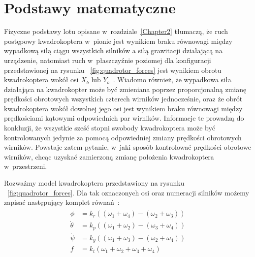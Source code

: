\documentclass[11pt, twoside]{Thesis} %
\begin{document}


\section{Podstawy matematyczne}

Fizyczne podstawy lotu opisane w~rozdziale~\ref{Chapter2} tłumaczą, że ruch postępowy kwadrokoptera w~pionie jest wynikiem braku równowagi między wypadkową siłą ciągu wszystkich silników a siłą grawitacji działającą na urządzenie, natomiast ruch w~płaszczyźnie poziomej dla konfiguracji przedstawionej na rysunku ~\ref{fig:quadrotor_forces} jest wynikiem obrotu kwadrokoptera wokół osi $X_b$ lub $Y_b$~\cite{quadro8, quadro9}. Wiadomo również, że wypadkowa siła działająca na kwadrokopter może być zmieniana poprzez proporcjonalną zmianę prędkości obrotowych wszystkich czterech wirników jednocześnie, oraz że obrót kwadrokoptera wokół dowolnej jego osi jest wynikiem braku równowagi między prędkościami kątowymi odpowiednich par wirników. Informacje te prowadzą do konkluzji, że wszystkie sześć stopni swobody kwadrokoptera może być kontrolowanych jedynie za pomocą odpowiedniej zmiany prędkości obrotowych wirników. Powstaje zatem pytanie, w~jaki sposób kontrolować prędkości obrotowe wirników, chcąc uzyskać zamierzoną zmianę położenia kwadrokoptera w~przestrzeni. 

Rozważmy model kwadrokoptera przedstawiony na rysunku ~\ref{fig:quadrotor_forces}. Dla tak oznaczonych osi oraz numeracji silników możemy zapisać następujący komplet równań~\cite{quadro9}:
\begin{equation}
\begin{aligned}
	\dot{\phi} &= k_r((\omega_1 + \omega_4) - (\omega_2 + \omega_3)) \\
	\dot{\theta} &= k_p((\omega_1 + \omega_2) - (\omega_3 + \omega_4)) \\
	\dot{\psi} &= k_y((\omega_1 + \omega_3) - (\omega_2 + \omega_4)) \\
	f &= k_t(\omega_1 + \omega_2 + \omega_3 + \omega_4)
\end{aligned}
\end{equation}
\end{document}
